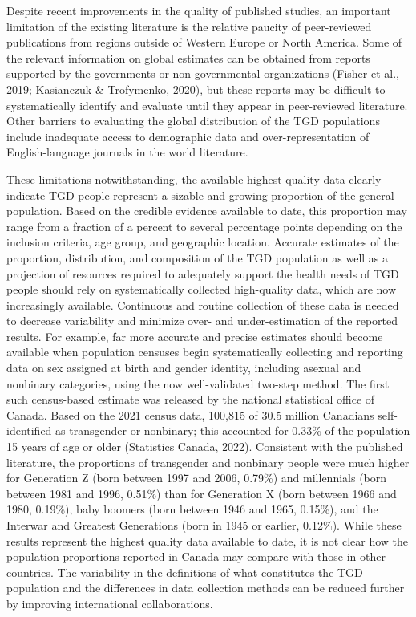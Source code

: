 \documentclass[
]{book}
\begin{document}
Despite recent improvements in the quality of
published studies, an important limitation of the
existing literature is the relative paucity of
peer-reviewed publications from regions outside
of Western Europe or North America. Some of
the relevant information on global estimates can
be obtained from reports supported by the governments or non-governmental organizations
(Fisher et al., 2019; Kasianczuk \& Trofymenko,
2020), but these reports may be difficult to systematically identify and evaluate until they appear
in peer-reviewed literature. Other barriers to evaluating the global distribution of the TGD populations include inadequate access to demographic
data and over-representation of English-language
journals in the world literature.

These limitations notwithstanding, the available
highest-quality data clearly indicate TGD people
represent a sizable and growing proportion of the
general population. Based on the credible evidence available to date, this proportion may range
from a fraction of a percent to several percentage
points depending on the inclusion criteria, age
group, and geographic location. Accurate estimates of the proportion, distribution, and composition of the TGD population as well as a
projection of resources required to adequately
support the health needs of TGD people should
rely on systematically collected high-quality data,
which are now increasingly available. Continuous
and routine collection of these data is needed to
decrease variability and minimize over- and
under-estimation of the reported results. For
example, far more accurate and precise estimates
should become available when population censuses begin systematically collecting and reporting data on sex assigned at birth and gender
identity, including asexual and nonbinary categories, using the now well-validated two-step
method. The first such census-based estimate was
released by the national statistical office of
Canada. Based on the 2021 census data, 100,815
of 30.5 million Canadians self-identified as transgender or nonbinary; this accounted for 0.33\%
of the population 15 years of age or older
(Statistics Canada, 2022). Consistent with the
published literature, the proportions of transgender and nonbinary people were much higher for
Generation Z (born between 1997 and 2006,
0.79\%) and millennials (born between 1981 and
1996, 0.51\%) than for Generation X (born
between 1966 and 1980, 0.19\%), baby boomers
(born between 1946 and 1965, 0.15\%), and the
Interwar and Greatest Generations (born in 1945
or earlier, 0.12\%). While these results represent
the highest quality data available to date, it is
not clear how the population proportions reported
in Canada may compare with those in other
countries. The variability in the definitions of
what constitutes the TGD population and the
differences in data collection methods can be
reduced further by improving international
collaborations.
\end{document}
